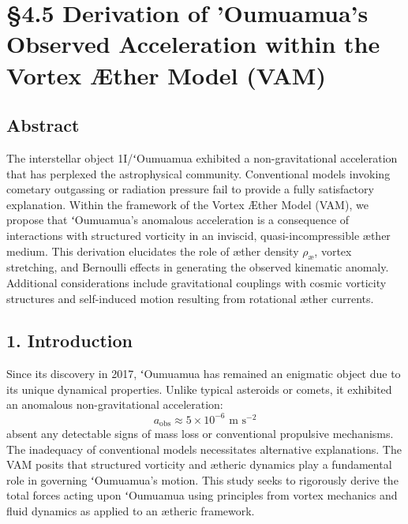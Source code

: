 

    \section*{§4.5 Derivation of 'Oumuamua’s Observed Acceleration within the Vortex Æther Model (VAM)}

    \subsection*{Abstract}
    The interstellar object 1I/ʻOumuamua exhibited a non-gravitational acceleration that has perplexed the astrophysical community. Conventional models invoking cometary outgassing or radiation pressure fail to provide a fully satisfactory explanation. Within the framework of the Vortex Æther Model (VAM), we propose that ʻOumuamua’s anomalous acceleration is a consequence of interactions with structured vorticity in an inviscid, quasi-incompressible æther medium. This derivation elucidates the role of æther density $\rho_{\text{\ae}}$, vortex stretching, and Bernoulli effects in generating the observed kinematic anomaly. Additional considerations include gravitational couplings with cosmic vorticity structures and self-induced motion resulting from rotational æther currents.

    \subsection*{1. Introduction}
    Since its discovery in 2017, ʻOumuamua has remained an enigmatic object due to its unique dynamical properties. Unlike typical asteroids or comets, it exhibited an anomalous non-gravitational acceleration:
    \begin{equation}
        a_{\text{obs}} \approx 5 \times 10^{-6} \text{ m s}^{-2}
    \end{equation}
    absent any detectable signs of mass loss or conventional propulsive mechanisms. The inadequacy of conventional models necessitates alternative explanations. The VAM posits that structured vorticity and ætheric dynamics play a fundamental role in governing ʻOumuamua’s motion. This study seeks to rigorously derive the total forces acting upon ʻOumuamua using principles from vortex mechanics and fluid dynamics as applied to an ætheric framework.

